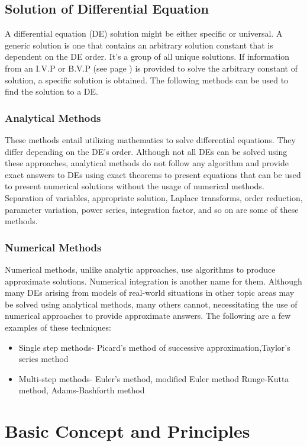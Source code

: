 \documentclass[12pt]{report}
\begin{document}
\subsection{Solution of Differential Equation}
A differential equation (DE) solution might be either specific or universal. A generic solution is one that contains an arbitrary solution constant that is dependent on the DE order. It's a group of all unique solutions. If information from an I.V.P or B.V.P (see page \pageref{sec: Problems of ODE}) is provided to solve the arbitrary constant of solution, a specific solution is obtained. The following methods can be used to find the solution to a DE.
\subsubsection{Analytical Methods}
These methods entail utilizing mathematics to solve differential equations. They differ depending on the DE's order. Although not all DEs can be solved using these approaches, analytical methods do not follow any algorithm and provide exact answers to DEs using exact theorems to present equations that can be used to present numerical solutions without the usage of numerical methods. Separation of variables, appropriate solution, Laplace transforms, order reduction, parameter variation, power series, integration factor, and so on are some of these methods.
\subsubsection{Numerical Methods}
Numerical methods, unlike analytic approaches, use algorithms to produce approximate solutions. Numerical integration is another name for them. Although many DEs arising from models of real-world situations in other topic areas may be solved using analytical methods, many others cannot, necessitating the use of numerical approaches to provide approximate answers. The following are a few examples of these techniques:
\begin{itemize}
	\item Single step methods-  Picard's method of successive approximation,Taylor's series method
	\item Multi-step methods- Euler's method, modified Euler method Runge-Kutta method, Adams-Bashforth method
\end{itemize}

\section{Basic Concept and Principles}
\end{document}
